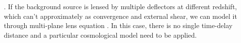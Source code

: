 \documentclass[useAMS,usenatbib]{mnras}
\newcommand\he{HE\,0435$-$1223}
\newcommand{\eref}[1]{Equation~(\ref{#1})}
\def\zl{z_{\ell}}
\def\zs{z_{s}}
\def\dt{D_{\Delta t}}
\begin{document}
. %
If the background source is lensed by multiple deflectors at different redshift, which can't approximately as convergence and external shear, we can model it through multi-plane lens equation \citep[e.g.,][]{BlandfordNarayan86,SEF92,Collett&Auger14,McCullyEtal14,WongEtal17}. In this case, there is no single time-delay distance and a particular cosmological model need to be applied. %
\end{document}
